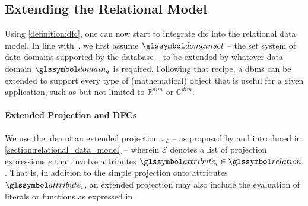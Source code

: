 \subsection{Extending the Relational Model}

Using \cref{definition:dfc}, one can now start to integrate \acrshort{dfc} into the relational data model. In line with~\cite{Giangreco:2018thesis}, we first assume  $\domainset$ -- the set system of data domains supported by the database -- to be extended by whatever data domain $\domain_q$ is required. Following that recipe, a \acrshort{dbms} can be extended to support every type of (mathematical) object that is useful for a given application, such as but not limited to $\mathbb{R}^{dim}$ or $\mathbb{C}^{dim}$. 

\paragraph{Extended Projection and DFCs}

We use the idea of an extended projection $\pi_{\mathcal{E}}$ -- as proposed by \cite{Gupta:1995Generalized,Garcia:2009Database} and introduced in \cref{section:relational_data_model} -- wherein $\mathcal{E}$ denotes a list of projection expressions $e$ that involve attributes $\attribute_i \in \relation$. That is, in addition to the simple projection onto attributes $\attribute_i$, an extended projection may also include the evaluation of literals or functions as expressed in . 

